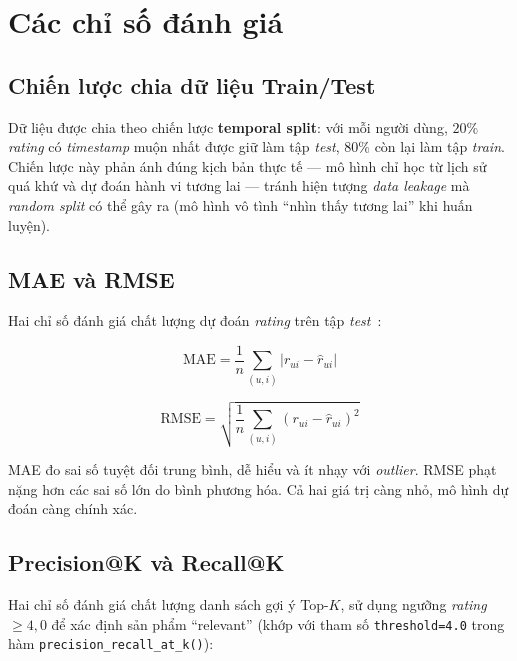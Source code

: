 \documentclass[../BTL.tex]{subfiles}
\begin{document}
\section{Các chỉ số đánh giá}
\label{section:2.4}

\subsection{Chiến lược chia dữ liệu Train/Test}
\label{section:2.4.1}

Dữ liệu được chia theo chiến lược \textbf{temporal split}: với mỗi người dùng,
$20\%$ \textit{rating} có \textit{timestamp} muộn nhất được giữ làm tập
\textit{test}, $80\%$ còn lại làm tập \textit{train}. Chiến lược này phản ánh đúng
kịch bản thực tế — mô hình chỉ học từ lịch sử quá khứ và dự đoán hành vi tương
lai — tránh hiện tượng \textit{data leakage} mà \textit{random split} có thể gây ra
(mô hình vô tình ``nhìn thấy tương lai'' khi huấn luyện).

\subsection{MAE và RMSE}
\label{section:2.4.2}

Hai chỉ số đánh giá chất lượng dự đoán \textit{rating} trên tập
\textit{test}~\cite{herlocker2004evaluating}:

\begin{equation}
    \text{MAE} = \frac{1}{n} \sum_{(u,i)} |r_{ui} - \hat{r}_{ui}|
    \label{eq:mae}
\end{equation}

\begin{equation}
    \text{RMSE} = \sqrt{\frac{1}{n} \sum_{(u,i)} (r_{ui} - \hat{r}_{ui})^2}
    \label{eq:rmse}
\end{equation}

MAE đo sai số tuyệt đối trung bình, dễ hiểu và ít nhạy với \textit{outlier}.
RMSE phạt nặng hơn các sai số lớn do bình phương hóa. Cả hai giá trị càng nhỏ,
mô hình dự đoán càng chính xác.

\subsection{Precision@K và Recall@K}
\label{section:2.4.3}

Hai chỉ số đánh giá chất lượng danh sách gợi ý Top-$K$, sử dụng ngưỡng
\textit{rating} $\geq 4{,}0$ để xác định sản phẩm ``relevant''
(khớp với tham số \texttt{threshold=4.0} trong hàm
\texttt{precision\_recall\_at\_k()}):
\end{document}
